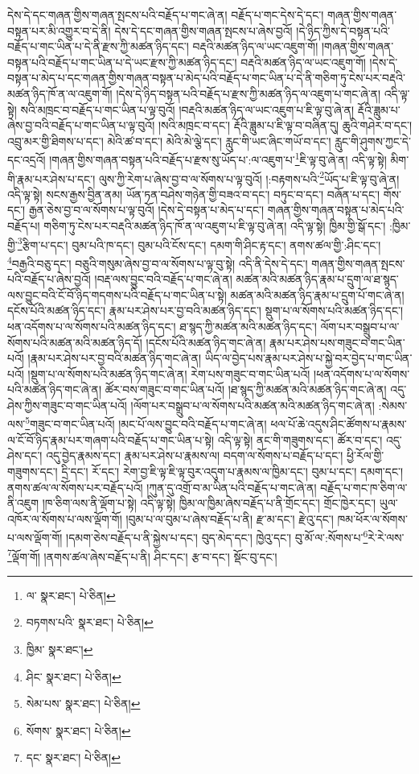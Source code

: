 དེས་དེ་དང་གཞན་གྱིས་གཞན་སྤངས་པའི་བརྗོད་པ་གང་ཞེ་ན། བརྗོད་པ་གང་དེས་དེ་དང་། གཞན་གྱིས་གཞན་བསྟན་པར་མི་འགྱུར་བ་དེ་ནི། དེས་དེ་དང་གཞན་གྱིས་གཞན་སྤངས་པ་ཞེས་བྱའོ། །དེ་ཉིད་ཀྱིས་དེ་བསྟན་པའི་བརྗོད་པ་གང་ཡིན་པ་དེ་ནི་རྫས་ཀྱི་མཚན་ཉིད་དང་། བརྡའི་མཚན་ཉིད་ལ་ཡང་འཇུག་གོ། །གཞན་གྱིས་གཞན་བསྟན་པའི་བརྗོད་པ་གང་ཡིན་པ་དེ་ཡང་རྫས་ཀྱི་མཚན་ཉིད་དང་། བརྡའི་མཚན་ཉིད་ལ་ཡང་འཇུག་གོ། །དེས་དེ་བསྟན་པ་མེད་པ་དང་གཞན་གྱིས་གཞན་བསྟན་པ་མེད་པའི་བརྗོད་པ་གང་ཡིན་པ་དེ་ནི་གཅིག་ཏུ་ངེས་པར་བརྡའི་མཚན་ཉིད་ཁོ་ན་ལ་འཇུག་གོ། །དེས་དེ་ཉིད་བསྟན་པའི་བརྗོད་པ་རྫས་ཀྱི་མཚན་ཉིད་ལ་འཇུག་པ་གང་ཞེ་ན། འདི་ལྟ་སྟེ། སའི་མཁྲང་བ་བརྗོད་པ་གང་ཡིན་པ་ལྟ་བུའོ། །བརྡའི་མཚན་ཉིད་ལ་ཡང་འཇུག་པ་ཇི་ལྟ་བུ་ཞེ་ན། རྡོའི་ཟླུམ་པ་ཞེས་བྱ་བའི་བརྗོད་པ་གང་ཡིན་པ་ལྟ་བུའོ། །སའི་མཁྲང་བ་དང་། རྡོའི་ཟླུམ་པ་ཇི་ལྟ་བ་བཞིན་དུ། ཆུའི་གཤེར་བ་དང་། འབྲུ་མར་གྱི་ཐིགས་པ་དང་། མེའི་ཚ་བ་དང་། མེའི་མེ་ལྕེ་དང་། རླུང་གི་ཡང་ཞིང་གཡོ་བ་དང་། རླུང་གི་ཤུགས་ཀྱང་དེ་དང་འདྲའོ། །གཞན་གྱིས་གཞན་བསྟན་པའི་བརྗོད་པ་རྫས་སུ་ཡོད་པ་:ལ་འཇུག་པ་\footnote{ལ་  སྣར་ཐང་།  པེ་ཅིན། }ཇི་ལྟ་བུ་ཞེ་ན། འདི་ལྟ་སྟེ། མིག་གི་རྣམ་པར་ཤེས་པ་དང་། ལུས་ཀྱི་རེག་པ་ཞེས་བྱ་བ་ལ་སོགས་པ་ལྟ་བུའོ། །:བརྟགས་པའི་\footnote{བཏགས་པའི་  སྣར་ཐང་།  པེ་ཅིན། }ཡོད་པ་ཇི་ལྟ་བུ་ཞེ་ན། འདི་ལྟ་སྟེ། སངས་རྒྱས་བྱིན་ནམ། ཡོན་ཏན་བཤེས་གཉེན་གྱི་བཟའ་བ་དང་། བཏུང་བ་དང་། བཞོན་པ་དང་། གོས་དང་། རྒྱན་ཅེས་བྱ་བ་ལ་སོགས་པ་ལྟ་བུའོ། །དེས་དེ་བསྟན་པ་མེད་པ་དང་། གཞན་གྱིས་གཞན་བསྟན་པ་མེད་པའི་བརྗོད་པ། གཅིག་ཏུ་ངེས་པར་བརྡའི་མཚན་ཉིད་ཁོ་ན་ལ་འཇུག་པ་ཇི་ལྟ་བུ་ཞེ་ན། འདི་ལྟ་སྟེ། ཁྱིམ་གྱི་སྒོ་དང་། :ཁྱིམ་གྱི་\footnote{ཁྱིམ་  སྣར་ཐང་། }རྩིག་པ་དང་། བུམ་པའི་ཁ་དང་། བུམ་པའི་ངོས་དང་། དམག་གི་ཤིང་རྟ་དང་། ནགས་ཚལ་གྱི་:ཤིང་དང་། \footnote{ཤིང་  སྣར་ཐང་།  པེ་ཅིན། }བརྒྱའི་བཅུ་དང་། བཅུའི་གསུམ་ཞེས་བྱ་བ་ལ་སོགས་པ་ལྟ་བུ་སྟེ། འདི་ནི་དེས་དེ་དང་། གཞན་གྱིས་གཞན་སྤངས་པའི་བརྗོད་པ་ཞེས་བྱའོ། །བརྡ་ལས་བྱུང་བའི་བརྗོད་པ་གང་ཞེ་ན། མཚན་མའི་མཚན་ཉིད་རྣམ་པ་དྲུག་ལ་ཐ་སྙད་ལས་བྱུང་བའི་ངོ་བོ་ཉིད་གདགས་པའི་བརྗོད་པ་གང་ཡིན་པ་སྟེ། མཚན་མའི་མཚན་ཉིད་རྣམ་པ་དྲུག་པོ་གང་ཞེ་ན། དངོས་པོའི་མཚན་ཉིད་དང་། རྣམ་པར་ཤེས་པར་བྱ་བའི་མཚན་ཉིད་དང་། སྡུག་པ་ལ་སོགས་པའི་མཚན་ཉིད་དང་། ཕན་འདོགས་པ་ལ་སོགས་པའི་མཚན་ཉིད་དང་། ཐ་སྙད་ཀྱི་མཚན་མའི་མཚན་ཉིད་དང་། ལོག་པར་བསྒྲུབ་པ་ལ་སོགས་པའི་མཚན་མའི་མཚན་ཉིད་དོ། །དངོས་པོའི་མཚན་ཉིད་གང་ཞེ་ན། རྣམ་པར་ཤེས་པས་གཟུང་བ་གང་ཡིན་པའོ། །རྣམ་པར་ཤེས་པར་བྱ་བའི་མཚན་ཉིད་གང་ཞེ་ན། ཡིད་ལ་བྱེད་པས་རྣམ་པར་ཤེས་པ་སྐྱེ་བར་བྱེད་པ་གང་ཡིན་པའོ། །སྡུག་པ་ལ་སོགས་པའི་མཚན་ཉིད་གང་ཞེ་ན། རེག་པས་གཟུང་བ་གང་ཡིན་པའོ། །ཕན་འདོགས་པ་ལ་སོགས་པའི་མཚན་ཉིད་གང་ཞེ་ན། ཚོར་བས་གཟུང་བ་གང་ཡིན་པའོ། །ཐ་སྙད་ཀྱི་མཚན་མའི་མཚན་ཉིད་གང་ཞེ་ན། འདུ་ཤེས་ཀྱིས་གཟུང་བ་གང་ཡིན་པའོ། །ལོག་པར་བསྒྲུབ་པ་ལ་སོགས་པའི་མཚན་མའི་མཚན་ཉིད་གང་ཞེ་ན། :སེམས་ལས་\footnote{སེམ་པས་  སྣར་ཐང་།  པེ་ཅིན། }གཟུང་བ་གང་ཡིན་པའོ། །མང་པོ་ལས་བྱུང་བའི་བརྗོད་པ་གང་ཞེ་ན། ཕལ་པོ་ཆེ་འདུས་ཤིང་ཚོགས་པ་རྣམས་ལ་ངོ་བོ་ཉིད་རྣམ་པར་གཞག་པའི་བརྗོད་པ་གང་ཡིན་པ་སྟེ། འདི་ལྟ་སྟེ། ནང་གི་གཟུགས་དང་། ཚོར་བ་དང་། འདུ་ཤེས་དང་། འདུ་བྱེད་རྣམས་དང་། རྣམ་པར་ཤེས་པ་རྣམས་ལ། བདག་ལ་སོགས་པ་བརྗོད་པ་དང་། ཕྱི་རོལ་གྱི་གཟུགས་དང་། དྲི་དང་། རོ་དང་། རེག་བྱ་ཇི་ལྟ་ཇི་ལྟ་བུར་འདུག་པ་རྣམས་ལ་ཁྱིམ་དང་། བུམ་པ་དང་། དམག་དང་། ནགས་ཚལ་ལ་སོགས་པར་བརྗོད་པའོ། །ཀུན་དུ་འགྲོ་བ་མ་ཡིན་པའི་བརྗོད་པ་གང་ཞེ་ན། བརྗོད་པ་གང་ཁ་ཅིག་ལ་ནི་འཇུག །ཁ་ཅིག་ལས་ནི་ལྡོག་པ་སྟེ། འདི་ལྟ་སྟེ། ཁྱིམ་ལ་ཁྱིམ་ཞེས་བརྗོད་པ་ནི་གྲོང་དང་། གྲོང་ཁྱེར་དང་། ཡུལ་འཁོར་ལ་སོགས་པ་ལས་ལྡོག་གོ། །བུམ་པ་ལ་བུམ་པ་ཞེས་བརྗོད་པ་ནི། རྫ་མ་དང་། རྫེའུ་དང་། ཁམ་ཕོར་ལ་སོགས་པ་ལས་ལྡོག་གོ། །དམག་ཅེས་བརྗོད་པ་ནི་སྐྱེས་པ་དང་། བུད་མེད་དང་། ཁྱེའུ་དང་། བུ་མོ་ལ་:སོགས་པ་\footnote{སོགས་  སྣར་ཐང་།  པེ་ཅིན། }རེ་རེ་ལས་\footnote{དང་  སྣར་ཐང་།  པེ་ཅིན། }ལྡོག་གོ། །ནགས་ཚལ་ཞེས་བརྗོད་པ་ནི། ཤིང་དང་། རྩ་བ་དང་། སྡོང་བུ་དང་། 